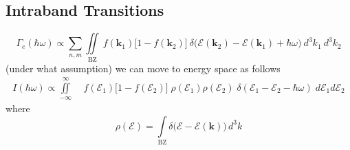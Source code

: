 \subsection{Intraband Transitions}
\label{sec:theoretical_intraband_transitions}

\begin{equation}
\Gamma_{e}(\hbar\omega) \propto \sum_{n, m} \iint\limits_{\text{BZ}}  \ f(\mathbf{k}_{1})\Big[ 1-f(\mathbf{k}_{2})\Big]\ \delta\big(\mathcal{E}(\mathbf{k}_{2}) - \mathcal{E}(\mathbf{k}_{1}) + \hbar\omega \big) \ d^{3}k_{1} \ d^{3}k_{2}
\label{eq:theoretical_intraband_bz}
\end{equation}
(under what assumption) we can move to energy space as follows
\begin{align}
I(\hbar\omega) \propto \iint\limits_{-\infty}^{\infty}\;& f(\mathcal{E}_1) \Big[1-f(\mathcal{E}_2)\Big] \;  \rho(\mathcal{E}_{1})\rho (\mathcal{E}_{2} )\; \delta(\mathcal{E}_1 - \mathcal{E}_2 - \hbar\omega) \;  d\mathcal{E}_1 d\mathcal{E}_2
\label{eq:theoretical_intraband_energy}
\end{align}
where
\begin{equation}
\rho(\mathcal{E}) = \int\limits_{\text{BZ}} \delta\Big(\mathcal{E}-\mathcal{E}(\mathbf{k})\Big) \, d^{3}k 
\label{eq:theoretical_intraband_rho}
\end{equation}
